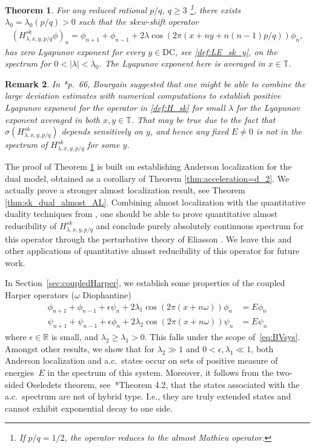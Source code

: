 \documentclass[11pt]{amsart}
\newtheorem{theorem}{Theorem}[section]
\newtheorem{remark}[theorem]{Remark}
\newcommand{\R}{\mathbb R}
\newcommand{\T}{\mathbb T}
\def\tor{\mathbb{T}}
\begin{document}
\begin{theorem}\label{thm:skew_shift}
    For any reduced rational $p/q$, $q\geq 3$ \footnote{If $p/q=1/2$, the operator reduces to the almost Mathieu operator.}, there exists $\lambda_0=\lambda_0(p/q)>0$ such that the skew-shift operator 
    \begin{align}\label{def:H_sk}
        (H^{sk}_{\lambda,x,y,p/q}\phi)_n=\phi_{n+1}+\phi_{n-1}+2\lambda \cos(2\pi(x+ny+n(n-1)p/q))\phi_n,
    \end{align}
    has zero Lyapunov exponent for every $y\in \mathrm{DC}$, see \eqref{def:LE_sk_y}, on the spectrum for $0<|\lambda|< \lambda_0$. The Lyapunov exponent here is averaged in $x\in\tor$. 
\end{theorem}
\begin{remark}
    In \cite{B1}*{p.~66}, Bourgain suggested that one might be able to combine the large deviation estimates with numerical computations to establish positive Lyapunov exponent for the operator in \eqref{def:H_sk} for small $\lambda$ for the Lyapunov exponent averaged in both $x,y\in \T$.
    That may be true due to the fact that $\sigma(H^{sk}_{\lambda,x,y,p/q})$ depends sensitively on $y$, and hence any fixed $E\neq 0$ is not in the spectrum of $H^{sk}_{\lambda,x,y,p/q}$ for some $y$.
\end{remark}
The proof of Theorem \ref{thm:skew_shift} is built on establishing Anderson localization for the dual model, obtained as a corollary of Theorem \ref{thm:acceleration=d_2}. We actually prove a stronger almost localization result, see Theorem \ref{thm:sk_dual_almost_AL}. Combining almost localization with the quantitative duality techniques from \cite{AJ}, one should be able to prove quantitative almost reducibility of $H^{sk}_{\lambda,x,y,p/q}$ and conclude purely absolutely continuous spectrum for this operator through the perturbative theory of Eliasson \cite{E}. We leave this and other applications of quantitative almost reducibility of this operator for future work.





In Section~\ref{sec:coupledHarper}, we establish some properties of the coupled Harper operators ($\omega$ Diophantine)
\begin{equation}
     \label{eq:Harpx2}
     \begin{split}
          \phi_{n+1}+\phi_{n-1}+\epsilon\psi_n + 2\lambda_1 \cos(2\pi(x+n\omega)) \phi_n &= E\phi_n \\
     \psi_{n+1}+\psi_{n-1}+\epsilon\phi_n + 2\lambda_2 \cos(2\pi(x+n\omega)) \psi_n &= E\psi_n
     \end{split}
\end{equation}
where $\epsilon\in\R$ is small,  and $\lambda_2\ge \lambda_1>0$. This falls under the scope of~\eqref{eq:BVsys}. Amongst other results, we show that for $\lambda_2\gg 1$ and $0<\epsilon,\lambda_1\ll 1$,  both Anderson localization and a.c.\ states occur on sets of positive measure of energies~$E$ in the spectrum of this system.  Moreover, it follows from the two-sided Oseledets theorem, see~\cite{V}*{Theorem 4.2}, that the states associated with the a.c.~spectrum are not of hybrid type. I.e., they are truly extended states and cannot exhibit exponential decay to one side. 
\end{document}
